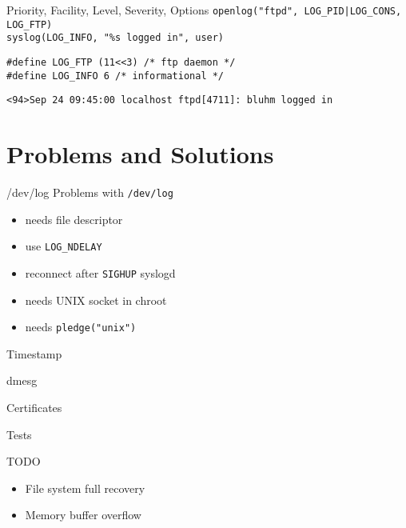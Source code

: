 \documentclass[14pt]{beamer}
\begin{document}
\begin{frame}{Priority, Facility, Level, Severity, Options}
    \texttt{openlog("ftpd", LOG\_PID|LOG\_CONS, LOG\_FTP)}\\
    \texttt{syslog(LOG\_INFO, "\%s logged in", user)}

    \vspace{.5cm}
    \texttt{\#define LOG\_FTP  (11<<3) /* ftp daemon */}\\
    \texttt{\#define LOG\_INFO 6       /* informational */ }

    \vspace{.5cm}
    \texttt{<94>Sep 24 09:45:00 localhost ftpd[4711]: bluhm logged in}
\end{frame}

\section{Problems and Solutions}

\begin{frame}{/dev/log}
Problems with \texttt{/dev/log}
\begin{itemize}
    \item needs file descriptor
    \item use \texttt{LOG\_NDELAY}
    \item reconnect after \texttt{SIGHUP} syslogd
    \item needs UNIX socket in chroot
    \item needs \texttt{pledge("unix")}
\end{itemize}
\end{frame}

\begin{frame}{Timestamp}
\end{frame}

\begin{frame}{dmesg}
\end{frame}

\begin{frame}{Certificates}
\end{frame}

\begin{frame}{Tests}
\end{frame}

\begin{frame}{TODO}
\begin{itemize}
    \item File system full recovery
    \item Memory buffer overflow
\end{itemize}
\end{frame}
\end{document}
